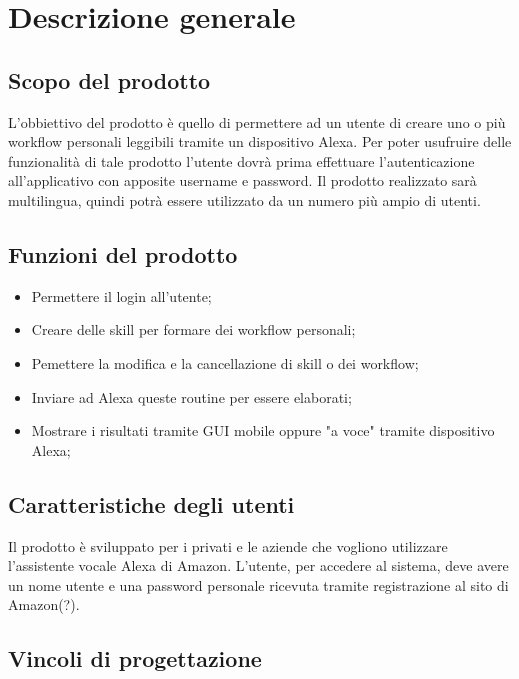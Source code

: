 \chapter{Descrizione generale}

\section{Scopo del prodotto}
L'obbiettivo del prodotto è quello di permettere ad un utente di creare uno o più workflow personali leggibili tramite un dispositivo Alexa.
Per poter usufruire delle funzionalità di tale prodotto l'utente dovrà prima effettuare l'autenticazione all'applicativo con apposite username e password.
Il prodotto realizzato sarà multilingua, quindi potrà essere utilizzato da un numero più ampio di utenti.


\section{Funzioni del prodotto}
\begin{itemize}
	\item Permettere il login all'utente;
	\item Creare delle skill per formare dei workflow personali;
	\item Pemettere la modifica e la cancellazione di skill o dei workflow;
	\item Inviare ad Alexa queste routine per essere elaborati;%
	\item Mostrare i risultati tramite GUI mobile oppure "a voce" tramite dispositivo Alexa;
\end{itemize}

\section{Caratteristiche degli utenti}
Il prodotto è sviluppato per i privati e le aziende che vogliono utilizzare l'assistente vocale Alexa di Amazon.
L'utente, per accedere al sistema, deve avere un nome utente e una password personale ricevuta tramite registrazione al sito di Amazon(?).

\section{Vincoli di progettazione}

